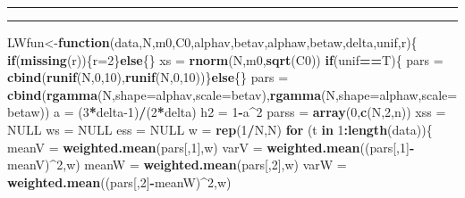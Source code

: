 \documentclass[
]{book}
\newenvironment{Shaded}{\begin{snugshade}}{\end{snugshade}}
\newcommand{\ControlFlowTok}[1]{\textcolor[rgb]{0.13,0.29,0.53}{\textbf{#1}}}
\newcommand{\DataTypeTok}[1]{\textcolor[rgb]{0.13,0.29,0.53}{#1}}
\newcommand{\DecValTok}[1]{\textcolor[rgb]{0.00,0.00,0.81}{#1}}
\newcommand{\KeywordTok}[1]{\textcolor[rgb]{0.13,0.29,0.53}{\textbf{#1}}}
\newcommand{\NormalTok}[1]{#1}
\newcommand{\OperatorTok}[1]{\textcolor[rgb]{0.81,0.36,0.00}{\textbf{#1}}}
\newcommand{\OtherTok}[1]{\textcolor[rgb]{0.56,0.35,0.01}{#1}}
\newcommand{\StringTok}[1]{\textcolor[rgb]{0.31,0.60,0.02}{#1}}
\theoremstyle{break}
\theoremstyle{nonumberplain}
\begin{document}
\hrule
\hrule

\begin{Shaded}
\begin{Highlighting}[]
\NormalTok{LWfun<-}\ControlFlowTok{function}\NormalTok{(data,N,m0,C0,alphav,betav,alphaw,betaw,delta,unif,r)\{}
  \ControlFlowTok{if}\NormalTok{(}\KeywordTok{missing}\NormalTok{(r))\{r=}\DecValTok{2}\NormalTok{\}}\ControlFlowTok{else}\NormalTok{\{\}}
\NormalTok{  xs     =}\StringTok{ }\KeywordTok{rnorm}\NormalTok{(N,m0,}\KeywordTok{sqrt}\NormalTok{(C0))}
  \ControlFlowTok{if}\NormalTok{(unif}\OperatorTok{==}\NormalTok{T)\{}
\NormalTok{  pars   =}\StringTok{ }\KeywordTok{cbind}\NormalTok{(}\KeywordTok{runif}\NormalTok{(N,}\DecValTok{0}\NormalTok{,}\DecValTok{10}\NormalTok{),}\KeywordTok{runif}\NormalTok{(N,}\DecValTok{0}\NormalTok{,}\DecValTok{10}\NormalTok{))\}}\ControlFlowTok{else}\NormalTok{\{\}}
\NormalTok{  pars   =}\StringTok{ }\KeywordTok{cbind}\NormalTok{(}\KeywordTok{rgamma}\NormalTok{(N,}\DataTypeTok{shape=}\NormalTok{alphav,}\DataTypeTok{scale=}\NormalTok{betav),}\KeywordTok{rgamma}\NormalTok{(N,}\DataTypeTok{shape=}\NormalTok{alphaw,}\DataTypeTok{scale=}\NormalTok{betaw))}
\NormalTok{  a      =}\StringTok{ }\NormalTok{(}\DecValTok{3}\OperatorTok{*}\NormalTok{delta}\DecValTok{-1}\NormalTok{)}\OperatorTok{/}\NormalTok{(}\DecValTok{2}\OperatorTok{*}\NormalTok{delta)}
\NormalTok{  h2     =}\StringTok{ }\DecValTok{1}\OperatorTok{-}\NormalTok{a}\OperatorTok{^}\DecValTok{2}
\NormalTok{  parss  =}\StringTok{ }\KeywordTok{array}\NormalTok{(}\DecValTok{0}\NormalTok{,}\KeywordTok{c}\NormalTok{(N,}\DecValTok{2}\NormalTok{,n))}
\NormalTok{  xss    =}\StringTok{ }\OtherTok{NULL}
\NormalTok{  ws     =}\StringTok{ }\OtherTok{NULL}
\NormalTok{  ess    =}\StringTok{ }\OtherTok{NULL}
\NormalTok{  w      =}\StringTok{ }\KeywordTok{rep}\NormalTok{(}\DecValTok{1}\OperatorTok{/}\NormalTok{N,N)}
  \ControlFlowTok{for}\NormalTok{ (t }\ControlFlowTok{in} \DecValTok{1}\OperatorTok{:}\KeywordTok{length}\NormalTok{(data))\{}
\NormalTok{    meanV =}\StringTok{ }\KeywordTok{weighted.mean}\NormalTok{(pars[,}\DecValTok{1}\NormalTok{],w)}
\NormalTok{    varV  =}\StringTok{ }\KeywordTok{weighted.mean}\NormalTok{((pars[,}\DecValTok{1}\NormalTok{]}\OperatorTok{-}\NormalTok{meanV)}\OperatorTok{^}\DecValTok{2}\NormalTok{,w)}
\NormalTok{    meanW =}\StringTok{ }\KeywordTok{weighted.mean}\NormalTok{(pars[,}\DecValTok{2}\NormalTok{],w)}
\NormalTok{    varW  =}\StringTok{ }\KeywordTok{weighted.mean}\NormalTok{((pars[,}\DecValTok{2}\NormalTok{]}\OperatorTok{-}\NormalTok{meanW)}\OperatorTok{^}\DecValTok{2}\NormalTok{,w)}
    

\end{Highlighting}
\end{Shaded}
\end{document}
